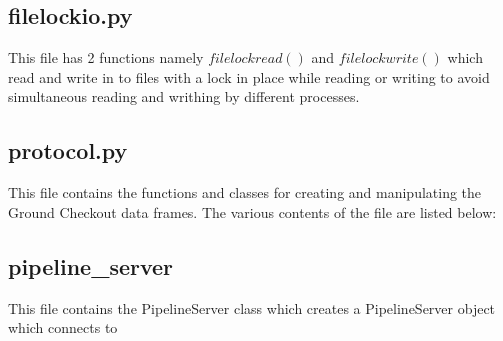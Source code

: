 \subsection{filelockio.py}
This file has 2 functions namely $filelockread()$ and $filelockwrite()$ which read
and write in to files with a lock in place while reading or writing to avoid
simultaneous reading and writhing by different processes.


\subsection{protocol.py}
This file contains the functions and classes for creating and manipulating the
Ground Checkout data frames. The various contents of the file are listed below:


\subsection{pipeline\_server}
This file contains the PipelineServer class which creates a PipelineServer
object which connects to
